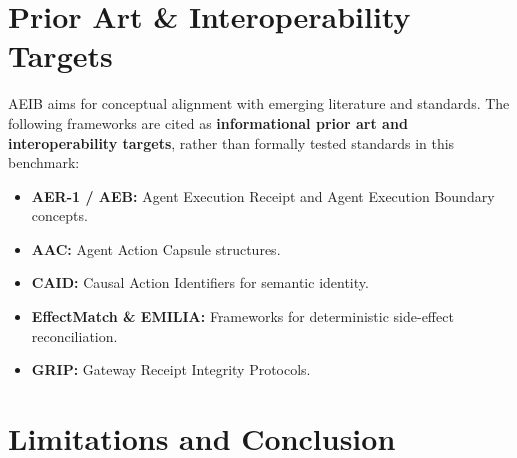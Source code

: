 \documentclass[10pt,journal,compsoc]{IEEEtran}
\begin{document}
\section{Prior Art \& Interoperability Targets}
AEIB aims for conceptual alignment with emerging literature and standards. The following frameworks are cited as \textbf{informational prior art and interoperability targets}, rather than formally tested standards in this benchmark:
\begin{itemize}
    \item \textbf{AER-1 / AEB:} Agent Execution Receipt and Agent Execution Boundary concepts.
    \item \textbf{AAC:} Agent Action Capsule structures.
    \item \textbf{CAID:} Causal Action Identifiers for semantic identity.
    \item \textbf{EffectMatch \& EMILIA:} Frameworks for deterministic side-effect reconciliation.
    \item \textbf{GRIP:} Gateway Receipt Integrity Protocols.
\end{itemize}

\section{Limitations and Conclusion}
\end{document}
